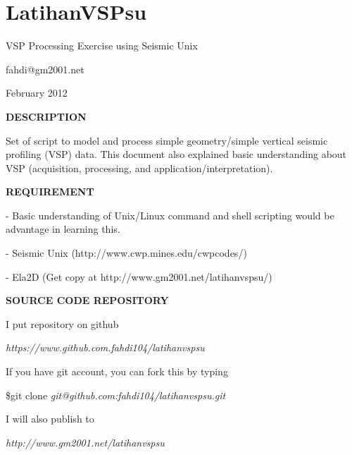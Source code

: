 \documentclass{article}
\begin{document}
\vspace{72pt}
\section*{{\LARGE{}\textbf{LatihanVSPsu}}}

\vspace{24pt}
VSP Processing Exercise using Seismic Unix

\vspace{12pt}
fahdi@gm2001.net

\vspace{12pt}
February 2012

\vspace{24pt}
\textbf{DESCRIPTION}

\vspace{24pt}
Set of script to model and process simple geometry/simple vertical seismic profiling 
(VSP) data. This document also explained basic understanding about VSP (acquisition, 
processing, and application/interpretation).

\vspace{24pt}
\textbf{REQUIREMENT }

\vspace{12pt}
- Basic understanding of Unix/Linux command and shell scripting would be advantage 
in learning this. 

\vspace{12pt}
- Seismic Unix (http://www.cwp.mines.edu/cwpcodes/)

\vspace{12pt}
- Ela2D (Get copy at http://www.gm2001.net/latihanvspsu/)\fancyfoot[LO]{\thepage{}}
\newpage

\newpage
\vspace{72pt}
\textbf{SOURCE CODE REPOSITORY}

\vspace{24pt}
I put repository on github

\vspace{12pt}
{\color{color02} \emph{https://www.github.com.fahdi104/latihanvspsu}}

\vspace{24pt}
If you have git account, you can fork this by typing

\vspace{12pt}
\$git clone {\color{color02} \emph{git@github.com:fahdi104/latihanvspsu.git}}

\vspace{24pt}
I will also publish to 

\vspace{12pt}
{\color{color02} \emph{http://www.gm2001.net/latihanvspsu}}
\end{document}
